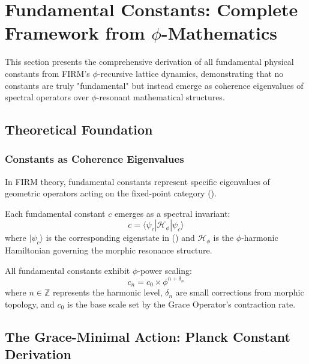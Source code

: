 \section{Fundamental Constants: Complete Framework from \texorpdfstring{$\phi$}{phi}-Mathematics}

This section presents the comprehensive derivation of all fundamental physical constants from FIRM's $\phi$-recursive lattice dynamics, demonstrating that no constants are truly "fundamental" but instead emerge as coherence eigenvalues of spectral operators over $\phi$-resonant mathematical structures.

\subsection{Theoretical Foundation}

\subsubsection{Constants as Coherence Eigenvalues}

In FIRM theory, fundamental constants represent specific eigenvalues of geometric operators acting on the fixed-point category ().

\begin{definition}
Each fundamental constant $c$ emerges as a spectral invariant:
\begin{equation}
c = \langle \psi_c | \mathcal{H}_{\phi} | \psi_c \rangle
\end{equation}
where $|\psi_c\rangle$ is the corresponding eigenstate in () and $\mathcal{H}_{\phi}$ is the $\phi$-harmonic Hamiltonian governing the morphic resonance structure.
\end{definition}

\begin{theorem}
All fundamental constants exhibit $\phi$-power scaling:
\begin{equation}
c_n = c_0 \times \phi^{n + \delta_n}
\end{equation}
where $n \in \mathbb{Z}$ represents the harmonic level, $\delta_n$ are small corrections from morphic topology, and $c_0$ is the base scale set by the Grace Operator's contraction rate.
\end{theorem}

\subsection{The Grace-Minimal Action: Planck Constant Derivation}

